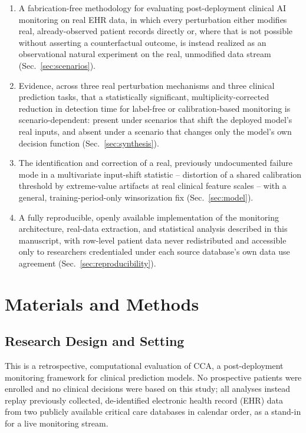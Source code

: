 \documentclass[preprintsapa,article,submit,oneauthor]{Definitions/mdpi}
\begin{document}
\begin{enumerate}
\item A fabrication-free methodology for evaluating post-deployment clinical AI monitoring on real EHR data, in which every perturbation either modifies real, already-observed patient records directly or, where that is not possible without asserting a counterfactual outcome, is instead realized as an observational natural experiment on the real, unmodified data stream (Sec.~\ref{sec:scenarios}).
\item Evidence, across three real perturbation mechanisms and three clinical prediction tasks, that a statistically significant, multiplicity-corrected reduction in detection time for label-free or calibration-based monitoring is scenario-dependent: present under scenarios that shift the deployed model's real inputs, and absent under a scenario that changes only the model's own decision function (Sec.~\ref{sec:synthesis}).
\item The identification and correction of a real, previously undocumented failure mode in a multivariate input-shift statistic -- distortion of a shared calibration threshold by extreme-value artifacts at real clinical feature scales -- with a general, training-period-only winsorization fix (Sec.~\ref{sec:model}).
\item A fully reproducible, openly available implementation of the monitoring architecture, real-data extraction, and statistical analysis described in this manuscript, with row-level patient data never redistributed and accessible only to researchers credentialed under each source database's own data use agreement (Sec.~\ref{sec:reproducibility}).
\end{enumerate}

\section{Materials and Methods}

\subsection{Research Design and Setting}

This is a retrospective, computational evaluation of CCA, a post-deployment monitoring framework for clinical prediction models. No prospective patients were enrolled and no clinical decisions were based on this study; all analyses instead replay previously collected, de-identified electronic health record (EHR) data from two publicly available critical care databases in calendar order, as a stand-in for a live monitoring stream.
\end{document}
